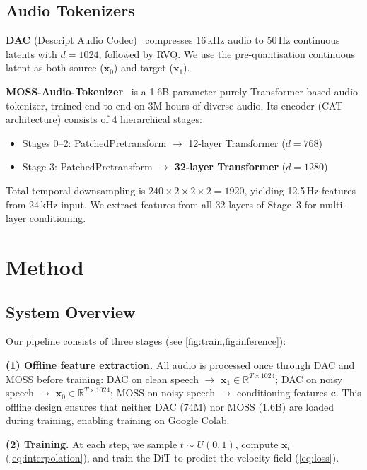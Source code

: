 \documentclass[10pt,twocolumn,letterpaper]{article}
\begin{document}
\subsection{Audio Tokenizers}

\textbf{DAC} (Descript Audio Codec)~\cite{kumar2024high} compresses 16\,kHz audio to 50\,Hz continuous latents with $d\!=\!1024$, followed by RVQ.
We use the pre-quantisation continuous latent as both source ($\mathbf{x}_0$) and target ($\mathbf{x}_1$).

\textbf{MOSS-Audio-Tokenizer}~\cite{gong2026moss} is a 1.6B-parameter purely Transformer-based audio tokenizer, trained end-to-end on 3M hours of diverse audio.
Its encoder (CAT architecture) consists of 4 hierarchical stages:
\begin{itemize}[itemsep=1pt,topsep=1pt]
  \item Stages 0--2: PatchedPretransform $\to$ 12-layer Transformer ($d\!=\!768$)
  \item Stage 3: PatchedPretransform $\to$ \textbf{32-layer Transformer} ($d\!=\!1280$)
\end{itemize}
Total temporal downsampling is $240 \!\times\! 2 \!\times\! 2 \!\times\! 2 = 1920$, yielding 12.5\,Hz features from 24\,kHz input.
We extract features from all 32 layers of Stage~3 for multi-layer conditioning.

\section{Method}
\label{sec:method}

\subsection{System Overview}

Our pipeline consists of three stages (see \cref{fig:train,fig:inference}):

\textbf{(1) Offline feature extraction.}
All audio is processed once through DAC and MOSS before training:
DAC on clean speech $\to$ $\mathbf{x}_1 \in \mathbb{R}^{T \times 1024}$;
DAC on noisy speech $\to$ $\mathbf{x}_0 \in \mathbb{R}^{T \times 1024}$;
MOSS on noisy speech $\to$ conditioning features $\mathbf{c}$.
This offline design ensures that neither DAC (74M) nor MOSS (1.6B) are loaded during training, enabling training on Google Colab.

\textbf{(2) Training.}
At each step, we sample $t \sim U(0,1)$, compute $\mathbf{x}_t$ (\cref{eq:interpolation}), and train the DiT to predict the velocity field (\cref{eq:loss}).
\end{document}
